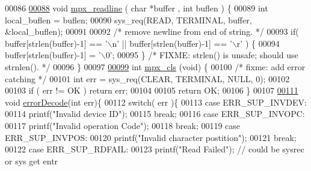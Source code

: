 \begin{DoxyCode}
{{00086 
\hypertarget{mpx__util_8c_source_l00088}{}\hyperlink{mpx__util_8h_a781169ab05ad54c0d37253d73060b77f}{00088} \textcolor{keywordtype}{void} \hyperlink{mpx__util_8c_a781169ab05ad54c0d37253d73060b77f}{mpx_readline} ( \textcolor{keywordtype}{char} *buffer , \textcolor{keywordtype}{int} buflen  ) \{
00089         \textcolor{keywordtype}{int} local\_buflen = buflen;
00090         sys\_req(READ, TERMINAL, buffer, &local\_buflen);
00091 
00092         \textcolor{comment}{/* remove newline from end of string. */}
00093         \textcolor{keywordflow}{if}( buffer[strlen(buffer)-1] == \textcolor{charliteral}{'\(\backslash\)n'} || buffer[strlen(buffer)-1] == \textcolor{charliteral}{'\(\backslash\)r'} 
      ) \{
00094                 buffer[strlen(buffer)-1] = \textcolor{charliteral}{'\(\backslash\)0'};
00095         \} \textcolor{comment}{/* FIXME: strlen() is unsafe; should use strnlen(). */}
00096 \}
00097 
\hypertarget{mpx__util_8c_source_l00099}{}\hyperlink{mpx__util_8h_a8cf3281978ba1652fd5d643e1a41f70b}{00099} \textcolor{keywordtype}{int} \hyperlink{mpx__util_8c_a8cf3281978ba1652fd5d643e1a41f70b}{mpx_cls} (\textcolor{keywordtype}{void}) \{
00100         \textcolor{comment}{/* fixme: add error catching */}
00101         \textcolor{keywordtype}{int} err = sys\_req(CLEAR, TERMINAL, NULL, 0);
00102         
00103         \textcolor{keywordflow}{if} ( err != OK ) \textcolor{keywordflow}{return} err;
00104         
00105         \textcolor{keywordflow}{return} OK;
00106 \}
00107 
\hypertarget{mpx__util_8c_source_l00111}{}\hyperlink{mpx__util_8h_a849eaf878bb59c0ed185a00d281047e9}{00111} \textcolor{keywordtype}{void} \hyperlink{mpx__util_8c_a849eaf878bb59c0ed185a00d281047e9}{errorDecode}(\textcolor{keywordtype}{int} err)\{
00112         \textcolor{keywordflow}{switch}( err )\{
00113                 \textcolor{keywordflow}{case} ERR\_SUP\_INVDEV:
00114                         printf(\textcolor{stringliteral}{"Invalid device ID"});
00115                         \textcolor{keywordflow}{break};
00116                 \textcolor{keywordflow}{case} ERR\_SUP\_INVOPC:
00117                         printf(\textcolor{stringliteral}{"Invalid operation Code"});
00118                         \textcolor{keywordflow}{break};
00119                 \textcolor{keywordflow}{case} ERR\_SUP\_INVPOS:
00120                         printf(\textcolor{stringliteral}{"Invalid character postition"});
00121                         \textcolor{keywordflow}{break};
00122                 \textcolor{keywordflow}{case} ERR\_SUP\_RDFAIL:
00123                         printf(\textcolor{stringliteral}{"Read Failed"}); \textcolor{comment}{// could be sysrec or sys get entr
}}}
\end{DoxyCode}
